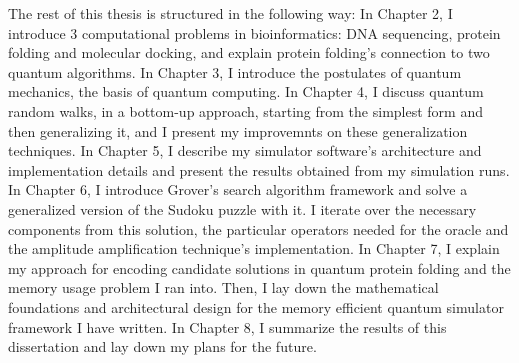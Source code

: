 The rest of this thesis is structured in the following way: In Chapter 2, I introduce 3 computational problems in bioinformatics: DNA sequencing, protein folding and molecular docking, and explain protein folding's connection to two quantum algorithms. In Chapter 3, I introduce the postulates of quantum mechanics, the basis of quantum computing. In Chapter 4, I discuss quantum random walks, in a bottom-up approach, starting from the simplest form and then generalizing it, and I present my improvemnts on these generalization techniques. In Chapter 5, I describe my simulator software's architecture and implementation details and present the results obtained from my simulation runs. In Chapter 6, I introduce Grover's search algorithm framework and solve a generalized version of the Sudoku puzzle with it. I iterate over the necessary components from this solution, the particular operators needed for the oracle and the amplitude amplification technique's implementation. In Chapter 7, I explain my approach for encoding candidate solutions in quantum protein folding and the memory usage problem I ran into. Then, I lay down the mathematical foundations and architectural design for the memory efficient quantum simulator framework I have written. In Chapter 8, I summarize the results of this dissertation and lay down my plans for the future.
